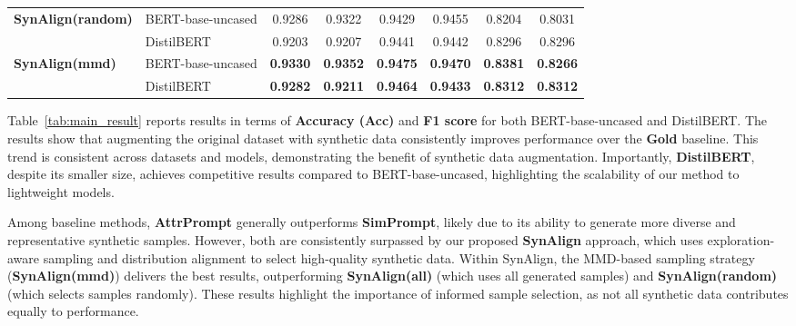 \begin{table*}[t]
{\begin{tabular}{llcccccc}
     \hline
    \textbf{SynAlign(random)} & BERT-base-uncased & 0.9286 & 0.9322 & 0.9429 & 0.9455 & 0.8204 & 0.8031 \\
     & DistilBERT & 0.9203 & 0.9207 & 0.9441 & 0.9442 & 0.8296 & 0.8296 \\
     \hline
    \textbf{SynAlign(mmd)} & BERT-base-uncased & \textbf{0.9330} & \textbf{0.9352} & \textbf{0.9475} & \textbf{0.9470} & \textbf{0.8381} & \textbf{0.8266} \\
     & DistilBERT & \textbf{0.9282} & \textbf{0.9211} & \textbf{0.9464} & \textbf{0.9433} & \textbf{0.8312} & \textbf{0.8312} \\
    \bottomrule
\end{tabular}}
\end{table*}

Table~\ref{tab:main_result} reports results in terms of \textbf{Accuracy (Acc)} and \textbf{F1 score} for both BERT-base-uncased\cite{bert} and DistilBERT\cite{distilbert}.
The results show that augmenting the original dataset with synthetic data consistently improves performance over the \textbf{Gold} baseline.
This trend is consistent across datasets and models, demonstrating the benefit of synthetic data augmentation. Importantly, \textbf{DistilBERT}, despite its smaller size, achieves competitive results compared to BERT-base-uncased, highlighting the scalability of our method to lightweight models.

Among baseline methods, \textbf{AttrPrompt} generally outperforms \textbf{SimPrompt}, likely due to its ability to generate more diverse and representative synthetic samples. However, both are consistently surpassed by our proposed \textbf{SynAlign} approach, which uses exploration-aware sampling and distribution alignment to select high-quality synthetic data. Within SynAlign, the MMD-based sampling strategy (\textbf{SynAlign(mmd)}) delivers the best results, outperforming \textbf{SynAlign(all)} (which uses all generated samples) and \textbf{SynAlign(random)} (which selects samples randomly). 
These results highlight the importance of informed sample selection, as not all synthetic data contributes equally to performance.

